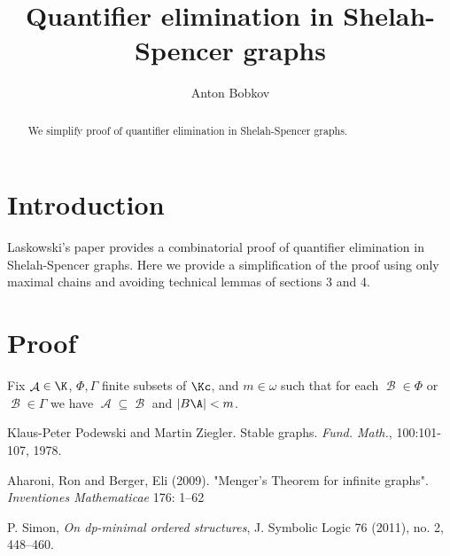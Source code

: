 \documentclass{amsart}
\DeclareMathOperator{\Ac}{\mathcal A}
\DeclareMathOperator{\Bc}{\mathcal B}
\begin{document}
\title{Quantifier elimination in Shelah-Spencer graphs}
\author{Anton Bobkov}

\begin{abstract}
	We simplify \cite{Laskowski} proof of quantifier elimination in Shelah-Spencer graphs.
\end{abstract}

\maketitle

\section{Introduction}

Laskowski's paper \cite{Laskowski} provides a combinatorial proof of quantifier elimination in Shelah-Spencer graphs. Here we provide a simplification of the proof using only maximal chains and avoiding technical lemmas of sections 3 and 4.

\section{Proof}

\begin{Definition}
	Fix $\Ac \in \K$, $\Phi, \Gamma$ finite subsets of $\Kc$, and $m \in \omega$ such that for each $\Bc \in \Phi$ or $\Bc \in \Gamma$ we have $\Ac \subseteq \Bc$ and $|B\A| < m$.
\end{Definition}

\begin{thebibliography}{9}

	Klaus-Peter Podewski and Martin Ziegler. Stable graphs. \textit{Fund. Math.}, 100:101-107, 1978.

	Aharoni, Ron and Berger, Eli (2009). "Menger's Theorem for infinite graphs". \textit{Inventiones Mathematicae} 176: 1–62
	
	P. Simon, \textit{On dp-minimal ordered structures}, J. Symbolic Logic 76 (2011), no. 2, 448–460.


\end{thebibliography}
\end{document}
